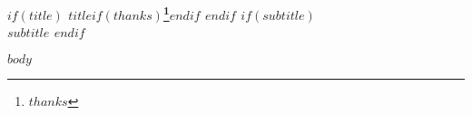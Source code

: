 \documentclass{article}%
\begin{document}

\begin{center}
\textbf{$if(title)$ $title$$if(thanks)$\thanks{$thanks$}$endif$ $endif$ $if(subtitle)$\\ $subtitle$ $endif$}
\end{center}

$body$
\end{document}
